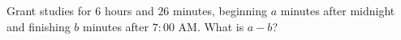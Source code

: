 Grant studies for $6$ hours and $26$ minutes, beginning $a$ minutes after midnight and finishing $b$ minutes after $7:00$ AM. What is $a-b$?
